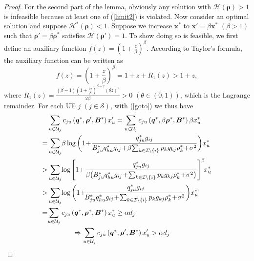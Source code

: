 \documentclass[10pt,journal,final,finalsubmission,twocolumn]{IEEEtran}
\begin{document}
\begin{proof}
For the second part of the lemma, obviously any solution with $\mathcal{H}(\boldsymbol{\rho}) > 1$ is infeasible because at least one of (\ref{limit2}) is violated. Now consider an optimal solution and suppose $\mathcal{H^*}(\boldsymbol{\rho}) < 1$. Suppose we increase $\boldsymbol{x}^*$ to $\boldsymbol{x}' =\beta\boldsymbol{x}^*$ $(\beta >1)$ such that $\boldsymbol{\rho}' =\beta\boldsymbol{\rho}^*$ satisfies $\mathcal{H}(\boldsymbol{\rho}') =1$. To show doing so is feasible, we first define an auxiliary function $f(z) = (1+\frac{z}{\beta})^\beta$. According to Taylor's formula, the auxiliary function can be written as
\begin{equation}\label{goto}
f(z) =(1+\frac{z}{\beta})^\beta=1+z+R_1(z)>1+z,
\end{equation}
where $R_1(z)=\frac {(\beta-1)(1+\frac{\theta z}{\beta})^{\beta-2}(\theta z)^2}{2\beta}>0$ $(\theta \in (0,1))$, which is the Lagrange remainder. For each UE $j$ $(j\in \mathcal{S})$, with (\ref{goto}) we thus have
\begin{align}
&\sum\limits_{u\in \mathcal{U}_j} c_{ju}\left (\boldsymbol{q}^*,\boldsymbol{ \rho}', \boldsymbol{B}^*\right ) x_u'=\sum\limits_{u\in \mathcal{U}_j} c_{ju}\left (\boldsymbol{q}^*,\beta\boldsymbol{ \rho}^*, \boldsymbol{B}^*\right ) \beta x_u^*\notag\\
=&\sum\limits_{u\in \mathcal{U}_j}\!\beta\log \bigg ( 1\!+\!\frac{q_{ju}^*g_{ij}}{{B_{ju}^*q_{hu}^*g_{ij}}\!+\!\beta{\sum\nolimits_{ k\in \mathcal{I}\setminus \left \{ i \right \}}p_kg_{kj}\rho_k^*}\!+\!\sigma ^2} \bigg ) x_u^*\notag\\
>& \sum\limits_{u\in \mathcal{U}_j}\!\log \Bigg [ 1\!+\!\frac{q_{ju}^*g_{ij}}{\beta\big({B_{ju}^*q_{hu}^*g_{ij}}\!+\!{\sum\nolimits_{k\in \mathcal{I}\setminus \left \{ i \right \}}p_kg_{kj}\rho_k^*}\!+\!\sigma ^2\big)} \Bigg ]^\beta \!x_u^*\label{lemma1-1}\notag\\
>&\sum\limits_{u\in \mathcal{U}_j}\!\log \bigg ( 1\!+\!\frac{q_{ju}^*g_{ij}}{\!\!{B_{ju}^*q_{hu}^*g_{ij}}\!+\!{\sum\nolimits_{k\in \mathcal{I}\setminus \left \{ i \right \}}p_kg_{kj}\rho_k^*}\!+\!\sigma ^2} \bigg ) x_u^*\notag\\
=&\!\sum\limits_{u\in \mathcal{U}_j} c_{ju}\left (\boldsymbol{q}^*,\boldsymbol{ \rho}^*, \boldsymbol{B}^*\right )  x_u^*\geq\alpha d_j\notag\\
\ &\ \ \ \ \ \ \ \ \ \ \ \Rightarrow \sum\limits_{u\in \mathcal{U}_j} c_{ju}\left (\boldsymbol{q}^*,\boldsymbol{ \rho}', \boldsymbol{B}^*\right ) x_u'>\alpha d_j
\end{align}


\end{proof}
\end{document}
